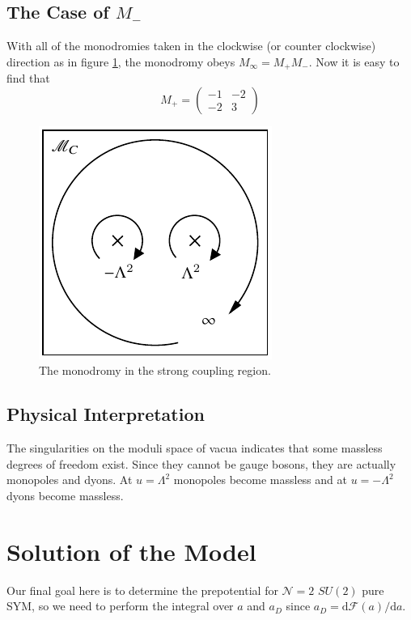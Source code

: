 \documentclass{article}
\begin{document}
\subsection{The Case of $M_-$}
With all of the monodromies taken in the clockwise (or counter clockwise) direction as in figure \ref{fig:finite}, the monodromy obeys $M_\infty=M_+ M_-$. Now it is easy to find that
\begin{equation}
M_{+}=\left(\begin{array}{cc}
-1 & -2 \\
-2 & 3
\end{array}\right)
\end{equation}

\begin{figure}[htbp]
\centering
\includegraphics{finite.pdf}
\caption{The monodromy in the strong coupling region.}
\label{fig:finite}
\end{figure}

\subsection{Physical Interpretation}
The singularities on the moduli space of vacua indicates that some massless degrees of freedom exist. Since they cannot be gauge bosons, they are actually monopoles and dyons. At $u=\Lambda^2$ monopoles become massless and at $u=-\Lambda^2$ dyons become massless.


\section{Solution of the Model}
Our final goal here is to determine the prepotential for $\mathcal{N}=2$ $SU(2)$ pure SYM, so we need to perform the integral over $a$ and $a_D$ since $a_D=\mathrm{d}\mathscr{F}(a)/\mathrm{d}a$.
\end{document}
